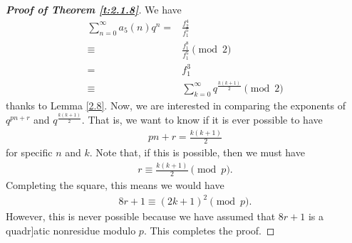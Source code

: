 \documentclass[a4paper,12pt,reqno]{amsart}
\numberwithin{equation}{section}
\begin{document}
	\begin{proof}[\it\textbf{Proof of Theorem \ref{t:2.1.8}}]
We have
\begin{align*}
	\sum_{n=0}^{\infty} a_5(n) q^n 
	=& \frac{f_2^4}{f_1^5} \\
	\equiv& \frac{f_1^8}{f_1^5}\pmod{2} \\
	=& f_1^3 \\
	\equiv& \sum_{k=0}^{\infty} q^{\frac{k(k+1)}{2}} \pmod{2}
\end{align*}
thanks to Lemma \ref{2.8}.
Now, we are interested in comparing the exponents of $q^{pn+r}$ and $q^{\frac{k(k+1)}{2}}$. That
is, we want to know if it is ever possible to have
\begin{align*}
	pn+r = \frac{k(k+1)}{2}
\end{align*}
for specific $n$ and $k$. Note that, if this is possible, then we must have
\begin{align*}
	r \equiv \frac{k(k+1)}{2} \pmod{p}.
\end{align*}
Completing the square, this means we would have
\begin{align*}
	8r + 1 \equiv (2k + 1)^2 \pmod{p}.
\end{align*}
However, this is never possible because we have assumed that $8r+1$ is a quadr]atic
nonresidue modulo $p$. This completes the proof.
\end{proof}
\end{document}
